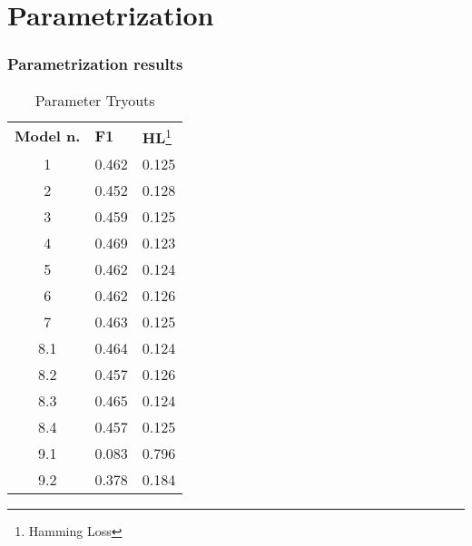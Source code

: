 \newcommand{\secttitle}{Parametrization}
\section{\secttitle}

\begin{frame}
	\frametitle{Parametrization results}
	\begin{table}[]
\centering
\caption{Parameter Tryouts}
\label{my-label}
\begin{tabular}{cll}
\multicolumn{1}{l}{\textbf{Model n.}} & \textbf{F1} & \textbf{HL}\footnote{Hamming Loss} \\
1                                                & 0.462       & 0.125                 \\
2                                                & 0.452       & 0.128                 \\
3                                                & 0.459       & 0.125                 \\
4                                                & 0.469       & 0.123                 \\
5                                                & 0.462       & 0.124                 \\
6                                                & 0.462       & 0.126                 \\
7                                                & 0.463       & 0.125                 \\
8.1                                              & 0.464       & 0.124                 \\
8.2                                              & 0.457       & 0.126                 \\
8.3                                              & 0.465       & 0.124                 \\
8.4                                              & 0.457       & 0.125                 \\
9.1                                              & 0.083       & 0.796                 \\
9.2                                              & 0.378       & 0.184                
\end{tabular}
\end{table}
\end{frame}

